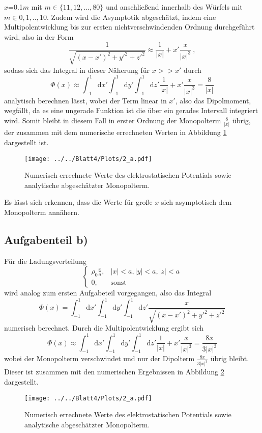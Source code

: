 $x$=0.1$m$ mit $m\in\{11,12,...,80\}$ und anschließend innerhalb des Würfels mit $m\in{0,1,..,10}$. Zudem wird die Asymptotik abgeschätzt, indem eine Multipolentwicklung bis zur ersten nichtverschwindenden Ordnung durchgeführt wird, also in der Form
\begin{equation}
  \frac{1}{\sqrt{(x-x')^2+y'^2+z'^2}}\approx \frac{1}{\lvert x \rvert}+ x'\frac{x}{\lvert x \rvert^3} \: ,
\end{equation}
sodass sich das Integral in dieser Näherung für $x>>x'$ durch
\begin{equation}
  \Phi(x)\approx\int_{-1}^{1}\text{d}x'\int_{-1}^{1}\text{d}y'\int_{-1}^{1}\text{d}z'\frac{1}{\lvert x \rvert}+x'\frac{x}{\lvert x \rvert^3} = \frac{8}{\lvert x \rvert}
\end{equation}
analytisch berechnen lässt, wobei der Term linear in $x'$, also das Dipolmoment, wegfällt, da es eine ungerade Funktion ist die über ein gerades Intervall integriert wird. Somit bleibt in diesem Fall in erster Ordnung der Monopolterm $\frac{8}{\lvert x \rvert}$ übrig, der zusammen mit dem numerische errechneten Werten in Abbildung \ref{fig:Phi_a} dargestellt ist.
\begin{figure}[H]
  \texttt{[image: ../../Blatt4/Plots/2\_a.pdf]}
  \caption{Numerisch errechnete Werte des elektrostatischen Potentials sowie analytische abgeschätzter Monopolterm.}
  \label{fig:Phi_a}
\end{figure}
Es lässt sich erkennen, dass die Werte für große $x$ sich asymptotisch dem Monopolterm annähern.


\subsection*{Aufgabenteil b)}
Für die Ladungsverteilung
\begin{equation}
  \begin{cases}
    \rho_0\frac{x}{a}, & \lvert x \rvert < a, \lvert y \rvert < a, \lvert z \rvert < a \\
    0, & \text{sonst}
  \end{cases}
\end{equation}
wird analog zum ersten Aufgabeteil vorgegangen, also das Integral
\begin{equation}
  \Phi(x)=\int_{-1}^{1}\text{d}x'\int_{-1}^{1}\text{d}y'\int_{-1}^{1}\text{d}z'\frac{x}{\sqrt{(x-x')^2+y'^2+z'^2}}
\end{equation}
numerisch berechnet. Durch die Multipolentwicklung
ergibt sich
\begin{equation}
  \Phi(x)\approx\int_{-1}^{1}\text{d}x'\int_{-1}^{1}\text{d}y'\int_{-1}^{1}\text{d}z'\frac{1}{\lvert x \rvert}+x'\frac{x}{\lvert x \rvert^3} = \frac{8x}{3\lvert x \rvert^3}
\end{equation}
wobei der Monopolterm verschwindet und nur der Dipolterm $\frac{8x}{3\lvert x \rvert^3}$ übrig bleibt. Dieser ist zusammen mit den
numerischen Ergebnissen in Abbildung \ref{fig:Phi_b} dargestellt.
\begin{figure}[H]
  \texttt{[image: ../../Blatt4/Plots/2\_a.pdf]}
  \caption{Numerisch errechnete Werte des elektrostatischen Potentials sowie analytische abgeschätzter Monopolterm.}
  \label{fig:Phi_b}
\end{figure}
